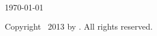 \begin{titlepage}
	\begin{addmargin}[-1cm]{-3cm}
    \begin{center}
        \large  

        \hfill

        \vfill

        \begingroup
            \color{Maroon}\spacedallcaps{\myTitle} \\ 
            \color{Maroon}\spacedallcaps{\mySubtitle} \\\bigskip
        \endgroup

        \spacedlowsmallcaps{\myName} \\\bigskip\bigskip

        \vfill


       \bigskip \bigskip \bigskip

        \today \bigskip \bigskip


        Copyright \textcopyright\ 2013 by \myName. All rights reserved.

        \vfill                      

    \end{center}  
  \end{addmargin}       
\end{titlepage}   